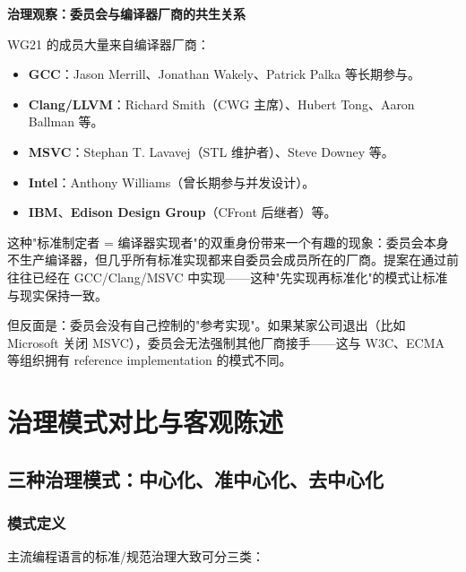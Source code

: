 \documentclass[12pt,a4paper,fontset=fandol]{ctexbook}
\begin{document}
\begin{govbox}
\textbf{治理观察：委员会与编译器厂商的共生关系}

WG21 的成员大量来自编译器厂商：

\begin{itemize}
  \item \textbf{GCC}：Jason Merrill、Jonathan Wakely、Patrick Palka 等长期参与。
  \item \textbf{Clang/LLVM}：Richard Smith（CWG 主席）、Hubert Tong、Aaron Ballman 等。
  \item \textbf{MSVC}：Stephan T. Lavavej（STL 维护者）、Steve Downey 等。
  \item \textbf{Intel}：Anthony Williams（曾长期参与并发设计）。
  \item \textbf{IBM}、\textbf{Edison Design Group}（CFront 后继者）等。
\end{itemize}

这种"标准制定者 = 编译器实现者"的双重身份带来一个有趣的现象：委员会本身不生产编译器，但几乎所有标准实现都来自委员会成员所在的厂商。提案在通过前往往已经在 GCC/Clang/MSVC 中实现——这种"先实现再标准化"的模式让标准与现实保持一致。

但反面是：委员会没有自己控制的"参考实现"。如果某家公司退出（比如 Microsoft 关闭 MSVC），委员会无法强制其他厂商接手——这与 W3C、ECMA 等组织拥有 reference implementation 的模式不同。
\end{govbox}

\part{治理模式对比与客观陈述}

\chapter{三种治理模式：中心化、准中心化、去中心化}

\section{模式定义}

主流编程语言的标准/规范治理大致可分三类：
\end{document}
